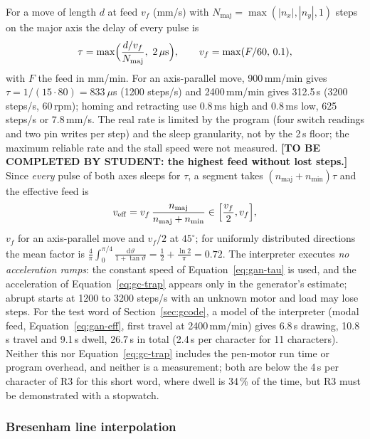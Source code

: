 For a move of length $d$ at feed $v_f$ (mm/s) with $N_{\mathrm{maj}}=\max(|n_x|,|n_y|,1)$ steps on the major axis the delay of every pulse is
\begin{equation}
\tau=\max\Bigl(\frac{d/v_f}{N_{\mathrm{maj}}},\ 2\,\mu\mathrm s\Bigr),\qquad v_f=\max(F/60,\,0.1),
\label{eq:gan-tau}
\end{equation}
with $F$ the feed in mm/min.
For an axis-parallel move, 900\,mm/min gives $\tau=1/(15\cdot80)=833\ \mu$s (1200 steps/s) and 2400\,mm/min gives 312.5\,\textmu s (3200 steps/s, 60\,rpm); homing and retracting use 0.8\,ms high and 0.8\,ms low, 625 steps/s or $7.8$\,mm/s.
The real rate is limited by the program (four switch readings and two pin writes per step) and the sleep granularity, not by the 2\,\textmu s floor; the maximum reliable rate and the stall speed were not measured.
\textbf{[TO BE COMPLETED BY STUDENT: the highest feed without lost steps.]}
Since \emph{every} pulse of both axes sleeps for $\tau$, a segment takes $(n_{\mathrm{maj}}+n_{\mathrm{min}})\tau$ and the effective feed is
\begin{equation}
v_{\mathrm{eff}}=v_f\,\frac{n_{\mathrm{maj}}}{n_{\mathrm{maj}}+n_{\mathrm{min}}}\in\Bigl[\frac{v_f}{2},v_f\Bigr],
\label{eq:gan-eff}
\end{equation}
$v_f$ for an axis-parallel move and $v_f/2$ at $45^\circ$; for uniformly distributed directions the mean factor is $\frac4\pi\int_0^{\pi/4}\frac{\mathrm d\vartheta}{1+\tan\vartheta}=\frac12+\frac{\ln2}{\pi}=0.72$.
The interpreter executes \emph{no acceleration ramps}: the constant speed of Equation~\ref{eq:gan-tau} is used, and the acceleration of Equation~\ref{eq:gc-trap} appears only in the generator's estimate; abrupt starts at 1200 to 3200 steps/s with an unknown motor and load may lose steps.
\label{sec:gan-timing}
For the test word of Section~\ref{sec:gcode}, a model of the interpreter (modal feed, Equation~\ref{eq:gan-eff}, first travel at 2400\,mm/min) gives 6.8\,s drawing, 10.8\,s travel and 9.1\,s dwell, 26.7\,s in total (2.4\,s per character for 11 characters).
Neither this nor Equation~\ref{eq:gc-trap} includes the pen-motor run time or program overhead, and neither is a measurement; both are below the 4\,s per character of R3 for this short word, where dwell is 34\,\% of the time, but R3 must be demonstrated with a stopwatch.

\subsubsection{Bresenham line interpolation}

